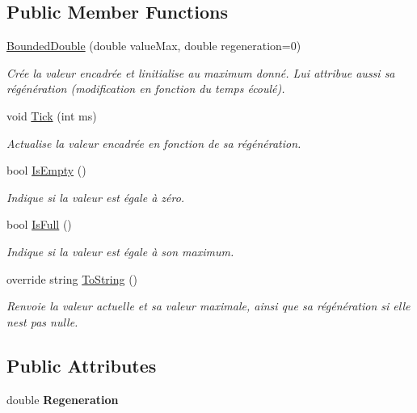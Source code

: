 \subsection*{Public Member Functions}
\begin{DoxyCompactItemize}
\item 
\hyperlink{class_tentacle_slicers_1_1general_1_1_bounded_double_a7cd57e6a16c703eb5a6e574f5d73585f}{Bounded\+Double} (double value\+Max, double regeneration=0)
\begin{DoxyCompactList}\small\item\em Crée la valeur encadrée et l\textquotesingle{}initialise au maximum donné. Lui attribue aussi sa régénération (modification en fonction du temps écoulé). \end{DoxyCompactList}\item 
void \hyperlink{class_tentacle_slicers_1_1general_1_1_bounded_double_a4b526f05b7941e604fd6fd1fffd0f6e2}{Tick} (int ms)
\begin{DoxyCompactList}\small\item\em Actualise la valeur encadrée en fonction de sa régénération. \end{DoxyCompactList}\item 
bool \hyperlink{class_tentacle_slicers_1_1general_1_1_bounded_double_abcc7a3b553b3c4744925510564e79a71}{Is\+Empty} ()
\begin{DoxyCompactList}\small\item\em Indique si la valeur est égale à zéro. \end{DoxyCompactList}\item 
bool \hyperlink{class_tentacle_slicers_1_1general_1_1_bounded_double_ae0119b85bb355e2a13431360fc90c186}{Is\+Full} ()
\begin{DoxyCompactList}\small\item\em Indique si la valeur est égale à son maximum. \end{DoxyCompactList}\item 
override string \hyperlink{class_tentacle_slicers_1_1general_1_1_bounded_double_af752b916206e8a8481cc9eeb201ed68e}{To\+String} ()
\begin{DoxyCompactList}\small\item\em Renvoie la valeur actuelle et sa valeur maximale, ainsi que sa régénération si elle n\textquotesingle{}est pas nulle. \end{DoxyCompactList}\end{DoxyCompactItemize}
\subsection*{Public Attributes}
\begin{DoxyCompactItemize}
\item 
\mbox{\label{class_tentacle_slicers_1_1general_1_1_bounded_double_aeffe74492bf4bfb019bcb92758cfe598}} 
double {\bfseries Regeneration}
\end{DoxyCompactItemize}
